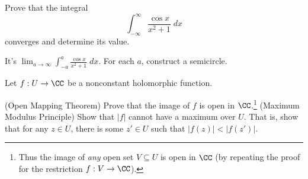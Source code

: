 \begin{problem}
	\yod
	Prove that the integral
	\[
		\int_{-\infty}^{\infty} \frac{\cos x}{x^2+1} \; dx
	\]
	converges and determine its value.
	\begin{hint}
		It's $\lim_{a \to \infty} \int_{-a}^{a} \frac{\cos x}{x^2+1} \; dx$.
		For each $a$, construct a semicircle.
	\end{hint}

\end{problem}

\begin{sproblem}
	\gim
	Let $f : U \to \CC$ be a nonconstant holomorphic function.
	\begin{enumerate}[(a)]
		\ii (Open Mapping Theorem)
		Prove that the image of $f$ is open in $\CC$.\footnote{%
			Thus the image of \emph{any}
			open set $V \subseteq U$ is open in $\CC$
			(by repeating the proof for the restriction $f : V \to \CC$).
		}
		\ii (Maximum Modulus Principle)
		Show that $\left\lvert f \right\rvert$
		cannot have a maximum over $U$.
		That is, show that for any $z \in U$, there is some $z' \in U$
		such that $\left\lvert f(z) \right\rvert < \left\lvert f(z') \right\rvert$.
	\end{enumerate}
\end{sproblem}
